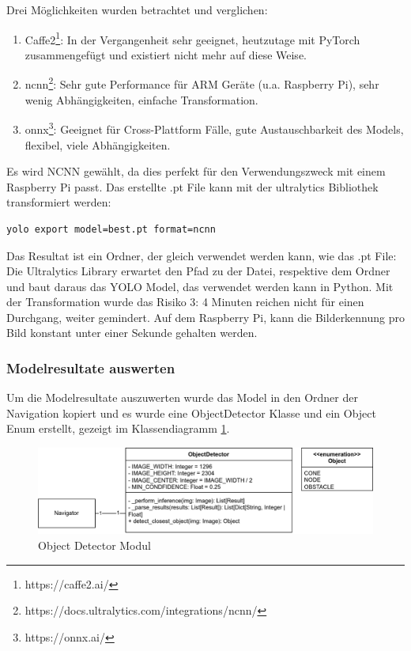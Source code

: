 Drei Möglichkeiten wurden betrachtet und verglichen:

\begin{enumerate}
    \item Caffe2\footnote{https://caffe2.ai/}: In der Vergangenheit sehr geeignet, heutzutage mit PyTorch zusammengefügt und existiert nicht mehr auf diese Weise.\cite{caffe2}
    \item \acrfull{ncnn}\footnote{https://docs.ultralytics.com/integrations/ncnn/}: Sehr gute Performance für ARM Geräte (u.a. Raspberry Pi), sehr wenig Abhängigkeiten, einfache Transformation.\cite{ncnn-bib}
    \item \acrfull{onnx}\footnote{https://onnx.ai/}: Geeignet für  Cross-Plattform Fälle, gute Austauschbarkeit des Models, flexibel, viele Abhängigkeiten.\cite{onnx-bib}
\end{enumerate}

Es wird NCNN gewählt, da dies perfekt für den Verwendungszweck mit einem Raspberry Pi passt. Das erstellte .pt File kann mit der ultralytics Bibliothek transformiert werden:

\begin{verbatim}
yolo export model=best.pt format=ncnn
\end{verbatim}

Das Resultat ist ein Ordner, der gleich verwendet werden kann, wie das .pt File: Die Ultralytics Library erwartet den Pfad zu der Datei, respektive dem Ordner und baut daraus das YOLO Model, das verwendet werden kann in Python. Mit der Transformation wurde das Risiko 3: 4 Minuten reichen nicht für einen Durchgang, weiter gemindert. Auf dem Raspberry Pi, kann die Bilderkennung pro Bild konstant unter einer Sekunde gehalten werden.

\subsubsection{Modelresultate auswerten}
\label{model-results}

Um die Modelresultate auszuwerten wurde das Model in den Ordner der Navigation kopiert und es wurde eine ObjectDetector Klasse und ein Object Enum erstellt, gezeigt im Klassendiagramm \ref{fig:nav-object-detector}.

 \begin{figure}[H]
\centering
\includegraphics[width= \textwidth ]{assets/IT/robot-sw-architecture-object-detector.png}
\caption{Object Detector Modul}
\label{fig:nav-object-detector}
\end{figure}


